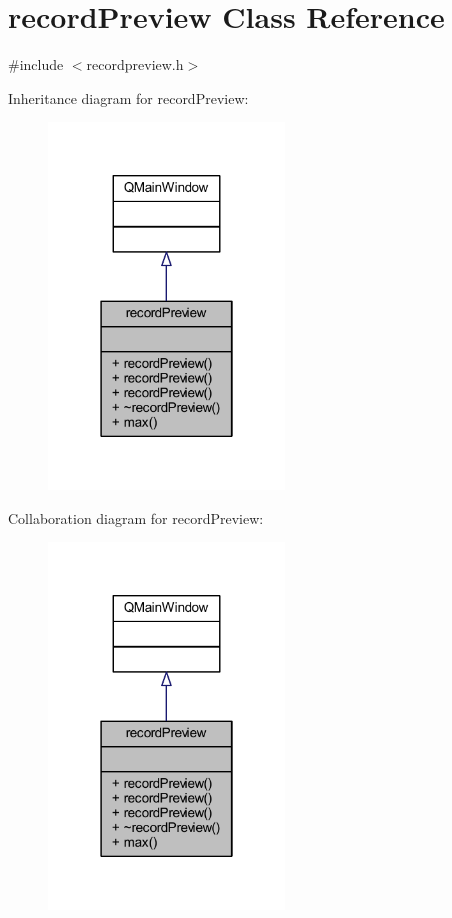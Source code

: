 \hypertarget{a00073}{\section{record\+Preview Class Reference}
\label{a00073}
}


{\ttfamily \#include $<$recordpreview.\+h$>$}



Inheritance diagram for record\+Preview\+:
\nopagebreak
\begin{figure}[H]
\begin{center}
\leavevmode
\includegraphics[width=178pt]{d8/d75/a00555}
\end{center}
\end{figure}


Collaboration diagram for record\+Preview\+:
\nopagebreak
\begin{figure}[H]
\begin{center}
\leavevmode
\includegraphics[width=178pt]{d6/d95/a00556}
\end{center}
\end{figure}
